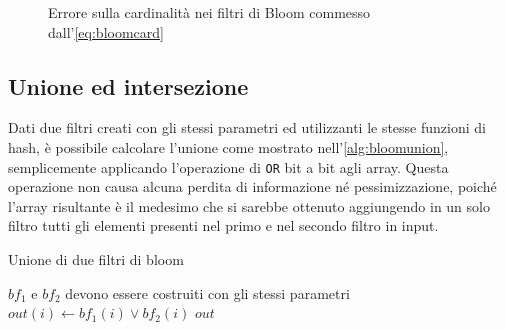 \begin{figure}
\begin{minipage}[c]{0.7\textwidth}
{		}
	\end{minipage}
	\qquad
	\begin{minipage}[c]{0.7\textwidth}
	\end{minipage}

	\caption{Errore sulla cardinalità nei filtri di Bloom com\-mes\-so dall'\autoref{eq:bloomcard}}
	\label{fig:bloomerror}
\end{figure}

\subsection{Unione ed intersezione}

Dati due filtri creati con gli stessi parametri ed utilizzanti le stesse funzioni di hash, è
possibile calcolare l'unione come mostrato nell'\autoref{alg:bloomunion}, semplicemente applicando
l'operazione di \verb|OR| bit a bit agli array. Questa operazione non causa alcuna perdita di
informazione né pessimizzazione, poiché l'array risultante è il medesimo che si sarebbe ottenuto
aggiungendo in un solo filtro tutti gli elementi presenti nel primo e nel secondo filtro in input.

\begin{algorithm}
\caption{Unione di due filtri di bloom}
\label{alg:bloomunion}
\begin{algorithmic}[1]
\Require $bf_1$ e $bf_2$ devono essere costruiti con gli stessi parametri
		\State $out(i) \gets bf_1(i) \lor bf_2(i)$
	\EndFor
	\State \Return $out$
\EndProcedure
\end{algorithmic}
\end{algorithm}


